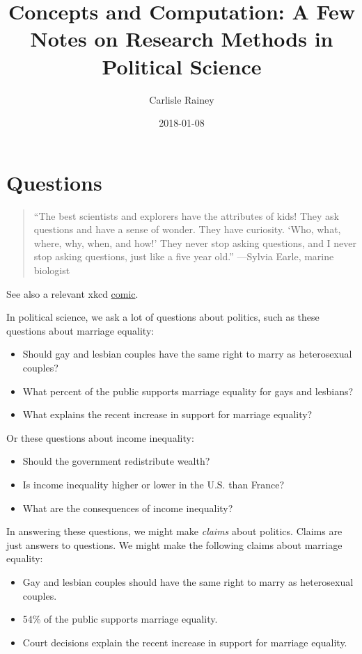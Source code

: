 \documentclass[]{book}
\title{Concepts and Computation: A Few Notes on Research Methods in Political
Science}
\author{Carlisle Rainey}
\date{2018-01-08}
\providecommand{\tightlist}{%
  \setlength{\itemsep}{0pt}\setlength{\parskip}{0pt}}
\theoremstyle{definition}
\theoremstyle{definition}
\theoremstyle{definition}
\theoremstyle{remark}
\begin{document}
\maketitle

{
\setcounter{tocdepth}{1}
\tableofcontents
}
\chapter{Questions}\label{questions}

\begin{quote}
``The best scientists and explorers have the attributes of kids! They
ask questions and have a sense of wonder. They have curiosity. `Who,
what, where, why, when, and how!' They never stop asking questions, and
I never stop asking questions, just like a five year old.'' ---Sylvia
Earle, marine biologist
\end{quote}

See also a relevant xkcd \href{https://xkcd.com/242/}{comic}.

In political science, we ask a lot of questions about politics, such as
these questions about marriage equality:

\begin{itemize}
\tightlist
\item
  Should gay and lesbian couples have the same right to marry as
  heterosexual couples?
\item
  What percent of the public supports marriage equality for gays and
  lesbians?
\item
  What explains the recent increase in support for marriage equality?
\end{itemize}

Or these questions about income inequality:

\begin{itemize}
\tightlist
\item
  Should the government redistribute wealth?
\item
  Is income inequality higher or lower in the U.S. than France?
\item
  What are the consequences of income inequality?
\end{itemize}

In answering these questions, we might make \emph{claims} about
politics. Claims are just answers to questions. We might make the
following claims about marriage equality:

\begin{itemize}
\tightlist
\item
  Gay and lesbian couples should have the same right to marry as
  heterosexual couples.
\item
  54\% of the public supports marriage equality.
\item
  Court decisions explain the recent increase in support for marriage
  equality.
\end{itemize}
\end{document}
